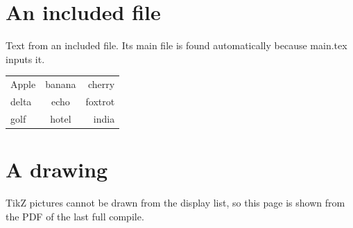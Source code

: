 \section{An included file}
Text from an included file. Its main file is found automatically because main.tex inputs it.

\begin{tabular}{lcr}
  Apple & banana & cherry \\
  delta & echo & foxtrot \\
  golf & hotel & india
\end{tabular}

\newpage
\section{A drawing}
TikZ pictures cannot be drawn from the display list, so this page is shown from the PDF of
the last full compile.

\begin{center}
\end{center}
